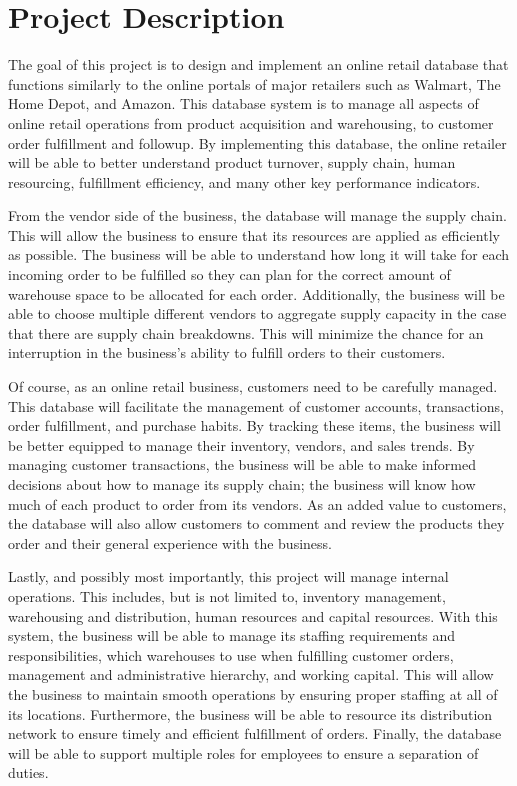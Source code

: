 \pagebreak
\section{Project Description}

The goal of this project is to design and implement an online retail database that functions similarly to the online portals of major retailers such as Walmart, The Home Depot, and Amazon.  This database system is to manage all aspects of online retail operations from product acquisition and warehousing, to customer order fulfillment and followup.  By implementing this database, the online retailer will be able to better understand product turnover, supply chain, human resourcing, fulfillment efficiency, and many other key performance indicators.

From the vendor side of the business, the database will manage the supply chain.  This will allow the business to ensure that its resources are applied as efficiently as possible.  The business will be able to understand how long it will take for each incoming order to be fulfilled so they can plan for the correct amount of warehouse space to be allocated for each order.  Additionally, the business will be able to choose multiple different vendors to aggregate supply capacity in the case that there are supply chain breakdowns.  This will minimize the chance for an interruption in the business's ability to fulfill orders to their customers.

Of course, as an online retail business, customers need to be carefully managed.  This database will facilitate the management of customer accounts, transactions, order fulfillment, and purchase habits.  By tracking these items, the business will be better equipped to manage their inventory, vendors, and sales trends.  By managing customer transactions, the business will be able to make informed decisions about how to manage its supply chain; the business will know how much of each product to order from its vendors.  As an added value to customers, the database will also allow customers to comment and review the products they order and their general experience with the business.

Lastly, and possibly most importantly, this project will manage internal operations.  This includes, but is not limited to, inventory management, warehousing and distribution, human resources and capital resources.  With this system, the business will be able to manage its staffing requirements and responsibilities, which warehouses to use when fulfilling customer orders, management and administrative hierarchy, and working capital.  This will allow the business to maintain smooth operations by ensuring proper staffing at all of its locations.  Furthermore, the business will be able to resource its distribution network to ensure timely and efficient fulfillment of orders.  Finally, the database will be able to support multiple roles for employees to ensure a separation of duties.